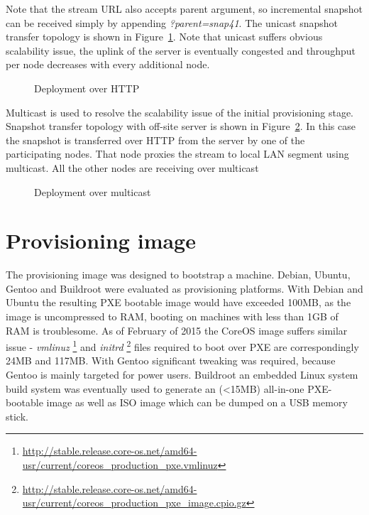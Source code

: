 \documentclass[a4paper,11pt]{kth-mag}
\begin{document}
Note that the stream URL also accepts parent argument,
so incremental snapshot can be received simply by appending
\emph{?parent=snap41}.
The unicast snapshot transfer topology is
shown in Figure~\ref{fig:butterknife-usecase-http}.
Note that unicast suffers obvious scalability issue,
the uplink of the server is eventually congested and
throughput per node decreases with every additional node.

\begin{figure}[!htb]
\centering
\scalebox{0.5}{}
\caption{Deployment over HTTP}
\label{fig:butterknife-usecase-http}
\end{figure}

Multicast is used to resolve the scalability issue of
the initial provisioning stage.
Snapshot transfer topology with off-site
server is shown in Figure~\ref{fig:butterknife-usecase-multicast}.
In this case the snapshot is transferred over HTTP from
the server by one of the participating nodes.
That node proxies the stream to local LAN segment using multicast.
All the other nodes are receiving over multicast

\begin{figure}[!htb]
\centering
\scalebox{0.5}{}
\caption{Deployment over multicast}
\label{fig:butterknife-usecase-multicast}
\end{figure}


\clearpage

\section{Provisioning image}

The provisioning image was designed to bootstrap a machine.
Debian, Ubuntu, Gentoo and Buildroot were evaluated as
provisioning platforms.
With Debian and Ubuntu the resulting PXE bootable
image would have exceeded 100MB, as the image
is uncompressed to RAM, booting on machines with
less than 1GB of RAM is troublesome.
As of February of 2015 the CoreOS image suffers similar issue -
\emph{vmlinuz}
\footnote{\url{http://stable.release.core-os.net/amd64-usr/current/coreos_production_pxe.vmlinuz}}
and
\emph{initrd}
\footnote{\url{http://stable.release.core-os.net/amd64-usr/current/coreos_production_pxe_image.cpio.gz}}
files required to boot over PXE are correspondingly 24MB and 117MB.
With Gentoo significant tweaking was required, because Gentoo is
mainly targeted for power users.
Buildroot
an embedded Linux system build system
was eventually used to generate an (<15MB)
all-in-one PXE-bootable image as well as ISO image
which can be dumped on a USB memory stick. \cite{tools-for-embedded-linux-dev}
\end{document}
